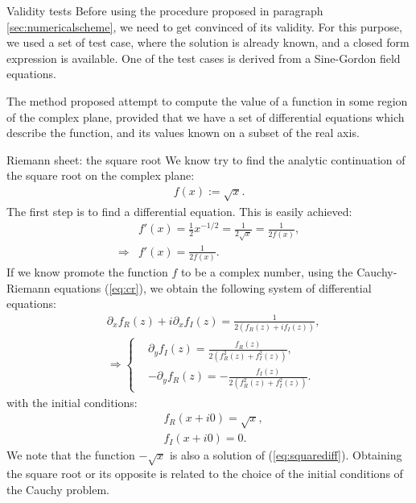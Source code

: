 \begin{section}{Validity tests}
  Before using the procedure proposed in paragraph
  \ref{sec:numericalscheme}, we need to get convinced of its
  validity. For this purpose, we used a set of test case, where the
  solution is already known, and a closed form expression is
  available. One of the test cases is derived from a Sine-Gordon field
  equations.

  The method proposed attempt to compute the value of a function in
  some region of the complex plane, provided that we have a set of
  differential equations which describe the function, and its values
  known on a subset of the real axis.
  \begin{subsection}{Riemann sheet: the square root}
    We know try to find the analytic continuation of the square root
    on the complex plane:
    \begin{align}
      f(x) := \sqrt{x}.
    \end{align}
    The first step is to find a differential equation. This is easily achieved:
    \begin{align}
      &f'(x) = \frac{1}{2}x^{-1/2} = \frac{1}{2\sqrt{x}} = \frac{1}{2f(x)},\\
      \Rightarrow &f'(x) = \frac{1}{2f(x)}.\label{eq:squarediff}
    \end{align}
    If we know promote the function $f$ to be a complex number, using
    the Cauchy-Riemann equations (\ref{eq:cr}), we obtain the
    following system of differential equations:
    \begin{align}
      &\partial_xf_R(z)+i\partial_xf_I(z) = \frac{1}{2(f_R(z)+if_I(z))},\\
      &\Rightarrow
      \left\{
      \begin{aligned}
        &\partial_yf_I(z) = \frac{f_R(z)}{2(f_R^2(z)+f_I^2(z))},\\
        &-\partial_yf_R(z) = -\frac{f_I(z)}{2(f_R^2(z)+f_I^2(z))}.
      \end{aligned}
      \right.
    \end{align}
    with the initial conditions:
    \begin{align}
      &f_R(x+i0) = \sqrt{x},\\
      &f_I(x+i0) = 0.
    \end{align}
    We note that the function $-\sqrt{x}$ is also a solution of
    (\ref{eq:squarediff}). Obtaining the square root or its opposite
    is related to the choice of the initial conditions of the Cauchy
    problem.


\end{subsection}
\end{section}
